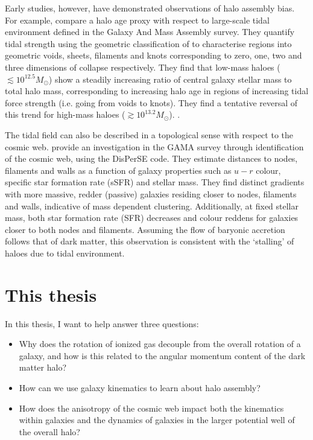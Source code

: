 Early studies, however, have demonstrated observations of halo assembly bias. For example, \citet{tojeiro2017} compare a halo age proxy with respect to large-scale tidal environment defined in the Galaxy And Mass Assembly \citep[GAMA;][]{driver2009, driver2011} survey. They quantify tidal strength using the geometric classification of \citet{eardley2015} to characterise regions into geometric voids, sheets, filaments and knots corresponding to zero, one, two and three dimensions of collapse respectively. They find that low-mass haloes ($\lesssim 10^{12.5} M_{\odot}$) show a steadily increasing ratio of central galaxy stellar mass to total halo mass, corresponding to increasing halo age in regions of increasing tidal force strength (i.e. going from voids to knots). They find a tentative reversal of this trend for high-mass haloes ($\gtrsim 10^{13.2} M_{\odot}$). \citep[See][who explicitly look for changes in halo to stellar mass ratio with geometric environment using stacked lensing profiles, but find no significant changes when averaging over halo mass.]{brouwer2016}.

The tidal field can also be described in a topological sense with respect to the cosmic web. \citet{kraljic2018} provide an investigation in the GAMA survey through identification of the cosmic web, using the DisPerSE code. They estimate distances to nodes, filaments and walls as a function of galaxy properties such as $u - r$ colour, specific star formation rate (sSFR) and stellar mass. They find distinct gradients with more massive, redder (passive) galaxies residing closer to nodes, filaments and walls, indicative of mass dependent clustering. Additionally, at fixed stellar mass, both star formation rate (SFR) decreases and colour reddens for galaxies closer to both nodes and filaments. Assuming the flow of baryonic accretion follows that of dark matter, this observation is consistent with the `stalling' of haloes due to tidal environment.

\section{This thesis}
In this thesis, I want to help answer three questions:

\begin{itemize}
    
    \item Why does the rotation of ionized gas decouple from the overall rotation of a galaxy, and how is this related to the angular momentum content of the dark matter halo?
    
    \item How can we use galaxy kinematics to learn about halo assembly? 
    
    \item How does the anisotropy of the cosmic web impact both the kinematics within galaxies and the dynamics of galaxies in the larger potential well of the overall halo?

\end{itemize}

